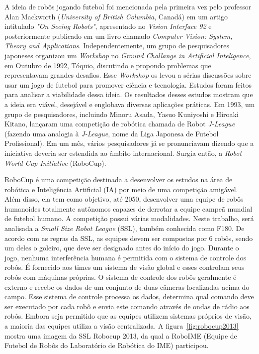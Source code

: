 A ideia de robôs jogando futebol foi mencionada pela primeira vez pelo professor
Alan Mackworth (\textit{University of British Columbia}, Canadá) em um artigo intitulado
\textit{"On Seeing Robots"}, apresentado no \textit{Vision Interface 92} e posteriormente publicado em
um livro chamado \textit{Computer Vision: System, Theory and Applications}. Independentemente,
um grupo de pesquisadores japoneses organizou um \textit{Workshop} no \textit{Ground Challange
in Artificial Inteligence}, em Outubro de 1992, Tóquio, discutindo e propondo problemas que
representavam grandes desafios. Esse \textit{Workshop} os levou a sérias discussões sobre
usar um jogo de futebol para promover ciência e tecnologia. Estudos foram feitos para
analisar a viabilidade dessa ideia. Os resultados desses estudos mostram que
a ideia era viável, desejável e englobava diversas aplicações práticas. Em 1993, um
grupo de pesquisadores, incluindo Minoru Asada, Yasuo Kuniyoshi e Hiroaki Kitano,
lançaram uma competição de robótica chamada de Robot \textit{J-League} (fazendo uma analogia à
\textit{J-League}, nome da Liga Japonesa de Futebol Profissional). Em um mês, vários
pesquisadores já se pronunciavam dizendo que a iniciativa deveria ser estendida ao
âmbito internacional. Surgia então, a \textit{Robot World Cup Initiative} (RoboCup).

RoboCup é uma competição destinada a desenvolver os estudos na área de robótica e
Inteligência Artificial (IA) por meio de uma competição amigável. Além disso, ela tem
como objetivo, até 2050, desenvolver uma equipe de robôs humanoides totalmente
autônomos capazes de derrotar a equipe campeã mundial de futebol humano. A competição
possui várias modalidades. Neste trabalho, será analisada a \textit{Small Size Robot League} (SSL),
também conhecida como F180. De acordo com as regras da SSL, as equipes devem ser
compostas por 6 robôs, sendo um deles o goleiro, que deve ser
designado antes do início do jogo. Durante o jogo, nenhuma interferência humana é
permitida com o sistema de controle dos robôs. É fornecido aos times um sistema de
visão global e esses controlam seus robôs com máquinas próprias. O sistema de controle
dos robôs geralmente é externo e recebe os dados de um conjunto de duas câmeras
localizadas acima do campo. Esse sistema de controle processa os dados, determina qual comando deve ser executado por
cada robô e envia este comando através de ondas de rádio aos robôs. Embora seja
permitido que as equipes utilizem sistemas próprios de visão, a maioria das
equipes utiliza a visão centralizada. A figura~\ref{fig:robocup2013} mostra uma
imagem da SSL Robocup 2013, da qual a RoboIME (Equipe de Futebol de Robôs do
Laboratório de Robótica do IME) participou.

